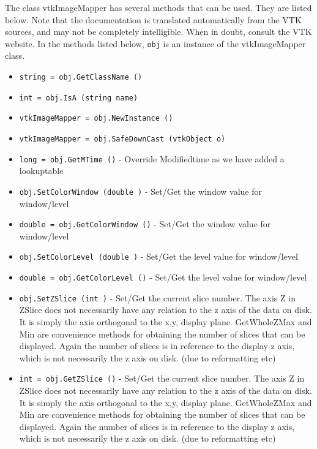 The class vtkImageMapper has several methods that can be used.
  They are listed below.
Note that the documentation is translated automatically from the VTK sources,
and may not be completely intelligible.  When in doubt, consult the VTK website.
In the methods listed below, \verb|obj| is an instance of the vtkImageMapper class.
\begin{itemize}
\item  \verb|string = obj.GetClassName ()|

\item  \verb|int = obj.IsA (string name)|

\item  \verb|vtkImageMapper = obj.NewInstance ()|

\item  \verb|vtkImageMapper = obj.SafeDownCast (vtkObject o)|

\item  \verb|long = obj.GetMTime ()| -  Override Modifiedtime as we have added a lookuptable

\item  \verb|obj.SetColorWindow (double )| -  Set/Get the window value for window/level

\item  \verb|double = obj.GetColorWindow ()| -  Set/Get the window value for window/level

\item  \verb|obj.SetColorLevel (double )| -  Set/Get the level value for window/level

\item  \verb|double = obj.GetColorLevel ()| -  Set/Get the level value for window/level

\item  \verb|obj.SetZSlice (int )| -  Set/Get the current slice number. The axis Z in ZSlice does not
 necessarily have any relation to the z axis of the data on disk.
 It is simply the axis orthogonal to the x,y, display plane.
 GetWholeZMax and Min are convenience methods for obtaining
 the number of slices that can be displayed. Again the number
 of slices is in reference to the display z axis, which is not
 necessarily the z axis on disk. (due to reformatting etc)

\item  \verb|int = obj.GetZSlice ()| -  Set/Get the current slice number. The axis Z in ZSlice does not
 necessarily have any relation to the z axis of the data on disk.
 It is simply the axis orthogonal to the x,y, display plane.
 GetWholeZMax and Min are convenience methods for obtaining
 the number of slices that can be displayed. Again the number
 of slices is in reference to the display z axis, which is not
 necessarily the z axis on disk. (due to reformatting etc)


\end{itemize}
